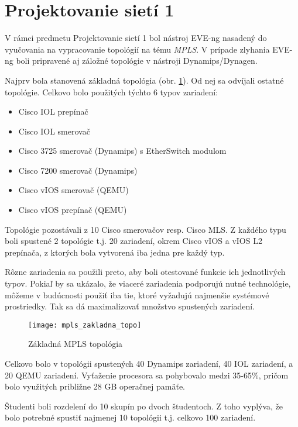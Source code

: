 \section{Projektovanie sietí 1}

V rámci predmetu Projektovanie sietí 1 bol nástroj EVE-ng nasadený do vyučovania na vypracovanie topológií na tému \emph{MPLS}. V prípade zlyhania EVE-ng boli pripravené aj záložné topológie v nástroji Dynamips/Dynagen.

Najprv bola stanovená základná topológia (obr. \ref{obr:mpls_zakladna_topo}). Od nej sa odvíjali ostatné topológie. Celkovo bolo použitých týchto 6 typov zariadení:

\begin{itemize}[noitemsep]
    \item Cisco IOL prepínač
    \item Cisco IOL smerovač
    \item Cisco 3725 smerovač (Dynamips) s EtherSwitch modulom
    \item Cisco 7200 smerovač (Dynamips)
    \item Cisco vIOS smerovač (QEMU)
    \item Cisco vIOS prepínač (QEMU)
\end{itemize}

Topológie pozostávali z 10 Cisco smerovačov resp. Cisco MLS. Z každého typu boli spustené 2 topológie t.j. 20 zariadení, okrem Cisco vIOS a vIOS L2 prepínača, z ktorých bola vytvorená iba jedna pre každý typ. 

Rôzne zariadenia sa použili preto, aby boli otestované funkcie ich jednotlivých typov. Pokiaľ by sa ukázalo, že viaceré zariadenia podporujú nutné technológie, môžeme v budúcnosti použiť iba tie, ktoré vyžadujú najmenšie systémové prostriedky. Tak sa dá maximalizovať množstvo spustených zariadení.


\begin{figure}
    \centering
    \texttt{[image: mpls\_zakladna\_topo]}
    \caption{Základná MPLS topológia}
    \label{obr:mpls_zakladna_topo}
    \cite{mpls_zakladna_topo}
\end{figure}

Celkovo bolo v topológii spustených 40 Dynamips zariadení, 40 IOL zariadení, a 20 QEMU zariadení. Vyťaženie procesora sa pohybovalo medzi 35-65\%, pričom bolo využitých približne 28 GB operačnej pamäťe.

Študenti boli rozdelení do 10 skupín po dvoch študentoch. Z toho vyplýva, že bolo potrebné spustiť najmenej 10 topológii t.j. celkovo 100 zariadení.

